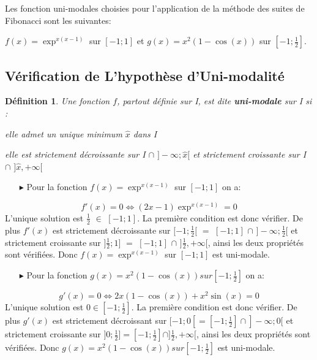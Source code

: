 \documentclass[a4paper,14pt]{article}
\newtheorem*{définition}{Définition}
\begin{document}
Les fonction uni-modales choisies pour l’application de la méthode des suites de Fibonacci sont les suivantes:

$f(x) = \exp^{x(x-1)}$ sur $[-1;1]$ et $g(x) = x^{2}(1-\cos(x))$ sur $[-1;\frac{1}{2}]$.

\subsection{Vérification de L'hypothèse d'Uni-modalité}
\begin{définition}
	Une fonction $f$, partout définie sur I, est dite \textbf{uni-modale} sur I si :
	\begin{list}{•}{}
	\item elle admet un unique minimum $\widehat{x}$ dans I
	\item elle est strictement décroissante sur I $\cap$ $]-\infty;\widehat{x}[$ et strictement croissante sur I $\cap$ $]\widehat{x}, +\infty[$\\
	\end{list}
\end{définition}

\begin{itemize}
\item[$\blacktriangleright$] Pour la fonction $f(x) = \exp^{x(x-1)}$ sur $[-1;1]$ on a:
\end{itemize}

\[ f'(x)=0 \Leftrightarrow (2x-1)\exp^{x(x-1)} = 0 \] L'unique solution est $\frac{1}{2}$ $\in$ $[-1;1]$. La première condition est donc vérifier. De plus $f'(x)$ est strictement décroissante sur $[-1;\frac{1}{2}[$ $=$ $[-1;1]$ $\cap$ $]-\infty;\frac{1}{2}[$ et strictement croissante sur $]\frac{1}{2};1]$ $=$ $[-1;1]$ $\cap$ $]\frac{1}{2}, +\infty[$, ainsi les deux propriétés sont vérifiées. Donc $f(x) = \exp^{x(x-1)}$ sur $[-1;1]$ est uni-modale.\\

\begin{itemize}
\item[$\blacktriangleright$] Pour la fonction $g(x) = x^{2}(1-\cos(x)) sur [-1;\frac{1}{2}]$ on a:
\end{itemize}

\[ g'(x)=0 \Leftrightarrow 2x(1-\cos(x)) + x^{2}\sin(x) = 0 \] L'unique solution est $0 \in [-1;\frac{1}{2}]$. La première condition est donc vérifier. De plus $g'(x)$ est strictement décroissant sur $[-1;0[ = [-1;\frac{1}{2}] \cap ]-\infty;0[$ et strictement croissante sur $]0;\frac{1}{2}] = [-1;\frac{1}{2}] \cap ]\frac{1}{2}, +\infty[$, ainsi les deux propriétés sont vérifiées. Donc $g(x) = x^{2}(1-\cos(x)) sur [-1;\frac{1}{2}]$ est uni-modale.
\end{document}
